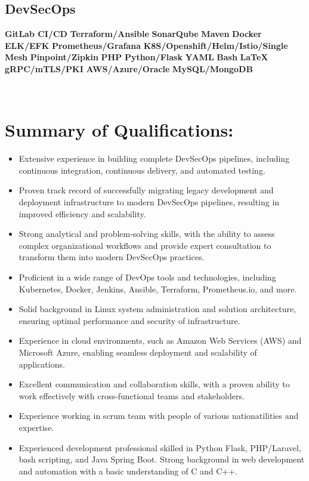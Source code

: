 \documentclass[]{friggeri-cv}
\begin{document}
\begin{aside}
  \section{DevSecOps}
    \textbf{GitLab CI/CD}
    \textbf{Terraform/Ansible}
    \textbf{SonarQube}
    \textbf{Maven}
    \textbf{Docker}
    \textbf{ELK/EFK}
    \textbf{Prometheus/Grafana}
    \textbf{K8S/Openshift/Helm/Istio/Single Mesh}
    \textbf{Pinpoint/Zipkin}
    \textbf{PHP}
    \textbf{Python/Flask}
    \textbf{YAML}
    \textbf{Bash}
    \textbf{LaTeX}
    \textbf{gRPC/mTLS/PKI}
    \textbf{AWS/Azure/Oracle}
    \textbf{MySQL/MongoDB}
    ~
\end{aside}
~
\section{Summary of Qualifications:}
\begin{itemize}
  \item Extensive experience in building complete DevSecOps pipelines, including continuous integration, continuous delivery, and automated testing.
  \item Proven track record of successfully migrating legacy development and deployment infrastructure to modern DevSecOps pipelines, resulting in improved efficiency and scalability.
  \item Strong analytical and problem-solving skills, with the ability to assess complex organizational workflows and provide expert consultation to transform them into modern DevSecOps practices.
  \item Proficient in a wide range of DevOps tools and technologies, including Kubernetes, Docker, Jenkins, Ansible, Terraform, Prometheus.io, and more.
  \item Solid background in Linux system administration and solution architecture, ensuring optimal performance and security of infrastructure.
  \item Experience in cloud environments, such as Amazon Web Services (AWS) and Microsoft Azure, enabling seamless deployment and scalability of applications.
  \item Excellent communication and collaboration skills, with a proven ability to work effectively with cross-functional teams and stakeholders.
  \item Experience working in scrum team with people of various nationatilities and expertise.
  \item Experienced development professional skilled in Python Flask, PHP/Laravel, bash scripting, and Java Spring Boot. Strong background in web development and automation with a basic understanding of C and C++. 
\end{itemize}
\end{document}
